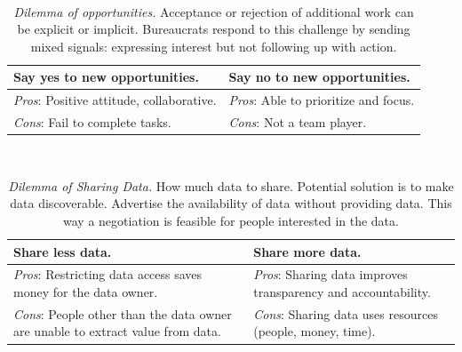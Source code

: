 \ \\

\begin{center}
\begin{table}[H] %
\begin{tabular}{ | m{\dilemmatablewidth}| m{\dilemmatablewidth} | } 
  \hline
  \textbf{Say yes to new opportunities.} & 
  \textbf{Say no to new opportunities.} \\ 
  \hline
  \textit{Pros}: Positive attitude, collaborative. &
  \textit{Pros}: Able to prioritize and focus. \\
  \hline
  \textit{Cons}: Fail to complete tasks. &
  \textit{Cons}: Not a team player. \\  
  \hline
\end{tabular}
\caption{\textit{Dilemma of opportunities.}
Acceptance or rejection of additional work can be explicit or implicit. Bureaucrats respond to this challenge by sending mixed signals: expressing interest but not following up with action.
}
\label{table:new-opportunties}
\end{table}
\end{center}

\ \\

\begin{center}
\begin{table}[H] %
\begin{tabular}{ | m{\dilemmatablewidth}| m{\dilemmatablewidth} | } 
  \hline
  \textbf{Share less data.} &
  \textbf{Share more data.} \\
  \hline
  \textit{Pros}: Restricting data access saves money for the data owner.&
  \textit{Pros}: Sharing data improves transparency and accountability. \\
  \hline
  \textit{Cons}: People other than the data owner are unable to extract value from data. & 
  \textit{Cons}: Sharing data uses resources (people, money, time). \\
  \hline
\end{tabular}
\caption{\textit{Dilemma of Sharing Data.}
How much data to share. Potential solution is to make data discoverable. Advertise the availability of data without providing data. This way a negotiation is feasible for people interested in the data.
}
\label{table:data_share-vs-hide}
\end{table}
\end{center}

